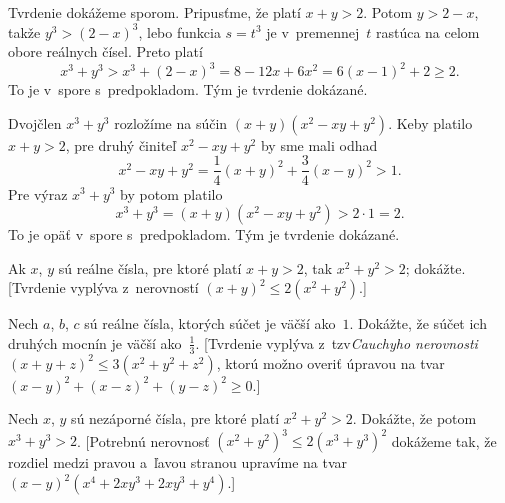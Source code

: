 {%
Tvrdenie dokážeme sporom.
Pripusťme, že platí $x+y>2$. Potom $y>2-x$, takže
$y^3>(2-x)^3$, lebo funkcia $s=t^3$ je v~premennej~$t$ rastúca
na celom obore reálnych čísel. Preto platí
$$
x^3+y^3>x^3+(2-x)^3=8-12x+6x^2=6(x-1)^2+2\ge2.
$$
To je v~spore s~predpokladom. Tým je tvrdenie dokázané.

\ineriesenie
Dvojčlen $x^3+y^3$ rozložíme na súčin
$(x+y)(x^2-xy+y^2)$. Keby platilo $x+y>2$, pre druhý činiteľ $x^2-xy+y^2$
by sme mali odhad
$$
x^2-xy+y^2=\frac14(x+y)^2+\frac34(x-y)^2>1.
$$
Pre výraz $x^3+y^3$ by potom platilo
$$
x^3+y^3=(x+y)(x^2-xy+y^2)>2\cdot1=2.
$$
To je opäť v~spore s~predpokladom. Tým je tvrdenie dokázané.

Ak $x$, $y$ sú reálne čísla, pre ktoré platí $x+y>2$, tak
$x^2+y^2>2$; dokážte.
[Tvrdenie vyplýva z~nerovností $(x+y)^2\le2(x^2+y^2)$.]

\D%
Nech $a$, $b$, $c$ sú reálne čísla, ktorých súčet je väčší ako~$1$.
Dokážte, že súčet ich druhých mocnín je väčší ako~$\frac13$.
[Tvrdenie vyplýva z~tzv\. {\it Cauchyho nerovnosti\/}
$(x+y+z)^2\le3(x^2+y^2+z^2)$, ktorú možno overiť úpravou na
tvar $(x-y)^2+(x-z)^2+(y-z)^2\ge0$.]

Nech $x$, $y$ sú nezáporné čísla, pre ktoré platí $x^2+y^2>2$.
Dokážte, že potom $x^3+y^3>2$.
[Potrebnú nerovnosť $(x^2+y^2)^3\le2(x^3+y^3)^2$ dokážeme tak,
že rozdiel medzi pravou a~ľavou stranou upravíme na tvar
$(x-y)^2(x^4+2xy^3+2xy^3+y^4)$.]
}

